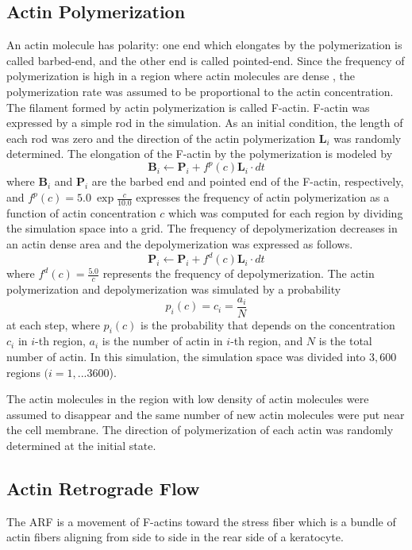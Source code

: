 \documentclass[a4paper,12pt, oneside]{book}
\begin{document}
\subsection{Actin Polymerization}
An actin molecule has polarity: one end which elongates by the polymerization is called barbed-end, and the other end is called pointed-end.
Since the frequency of polymerization is high in a region where actin molecules are dense \cite{yumura1998spatiotemporal}, the polymerization rate was assumed to be  proportional to the actin concentration.
The filament formed by actin polymerization is called F-actin.
F-actin was expressed by a simple  rod in the simulation. 
As an initial condition,  the length of each rod was zero and the direction of the actin polymerization $\bm{L}_i$ was  randomly determined.
The elongation of the F-actin by the polymerization is modeled by
\begin{equation}
\bm{B}_i \gets \bm{P}_i + f^p(c)\bm{L}_i \cdot dt
\end{equation}
where $\bm{B}_i$ and $\bm{P}_i$ are the barbed end and pointed end of the F-actin, respectively, and $f^p(c) = 5.0~\exp{\frac{c}{10.0}}$ expresses the frequency of actin polymerization as a function of actin concentration $c$ which was computed for each region by dividing the simulation space into a grid.
The frequency of depolymerization decreases in an actin dense area and the depolymerization was expressed  as follows.
\begin{equation}
\bm{P}_i \gets \bm{P}_i + f^d(c)\bm{L}_i \cdot dt
\end{equation}
where $f^d(c) = \frac{5.0}{c}$ represents the frequency of depolymerization. 
The actin polymerization and depolymerization was simulated by a probability  \[p_i(c) = c_i = \frac{a_i}{N}\] at each step, where $p_i(c)$ is the probability that depends on the concentration $c_i$ in $i$-th region, $a_i$ is the number of actin in $i$-th region, and $N$ is the total number of actin.
In this simulation, the simulation space was divided into $3,600$ regions $(i = 1,...3600$).

The actin molecules in the region with  low density of actin molecules were assumed to disappear and the same number of new actin molecules were put near the cell membrane.
The direction of polymerization of each actin was randomly determined at the initial state. 

\subsection{Actin Retrograde Flow}
The ARF is a movement of F-actins toward the stress fiber which is a bundle of actin fibers aligning from side to side in the rear side of a keratocyte. 
\end{document}
